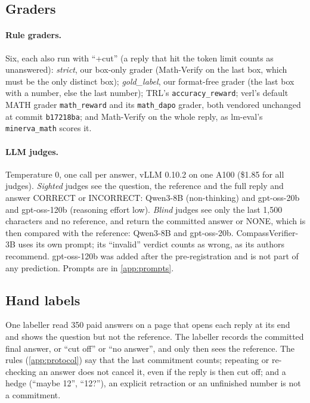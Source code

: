\documentclass[10pt]{article}
\begin{document}
\subsection{Graders}
\label{sec:graders}
\paragraph{Rule graders.} Six, each also run with ``+cut'' (a reply that hit the token limit counts as
unanswered): \emph{strict}, our box-only grader (Math-Verify on the last box, which must be the only
distinct box); \emph{gold\_label}, our format-free grader (the last box with a number, else the last number);
TRL's \texttt{accuracy\_reward}; verl's default MATH grader \texttt{math\_reward} and its
\texttt{math\_dapo} grader, both vendored unchanged at commit \texttt{b17218ba}; and Math-Verify on the
whole reply, as lm-eval's \texttt{minerva\_math} scores it.

\paragraph{LLM judges.} Temperature 0, one call per answer, vLLM 0.10.2 on one A100 (\$1.85 for all judges).
\emph{Sighted} judges see the question, the reference and the full reply and answer CORRECT or INCORRECT:
Qwen3-8B (non-thinking) and gpt-oss-20b and gpt-oss-120b \citep{gptoss} (reasoning effort low).
\emph{Blind} judges see only the last 1,500 characters and no reference, and return the committed answer or
NONE, which is then compared with the reference: Qwen3-8B and gpt-oss-20b. CompassVerifier-3B
\citep{compassverifier} uses its own prompt; its ``invalid'' verdict counts as wrong, as its authors
recommend. gpt-oss-120b was added after the pre-registration and is not part of any prediction. Prompts are
in \cref{app:prompts}.

\subsection{Hand labels}
\label{sec:labels}
One labeller read 350 paid answers on a page that opens each reply at its end and shows the question but
not the reference. The labeller records the committed final answer, or ``cut off'' or ``no answer'', and
only then sees the reference. The rules (\cref{app:protocol}) say that the last commitment counts;
repeating or re-checking an answer does not cancel it, even if the reply is then cut off; and a hedge
(``maybe 12'', ``12?''), an explicit retraction or an unfinished number is not a commitment.
\end{document}
